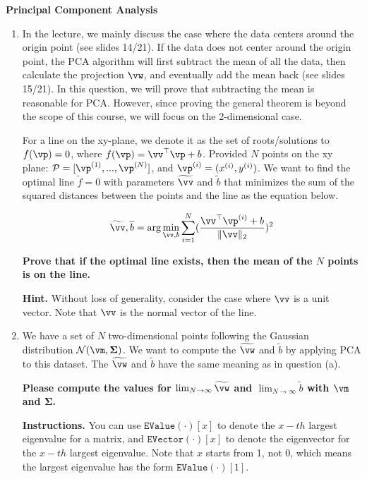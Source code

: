 \begin{Q}
\textbf{\Large Principal Component Analysis}\\

\begin{enumerate}

\item In the lecture, we mainly discuss the case where the data centers around the origin point (see slides 14/21). If the data does not center around the origin point, the PCA algorithm will first subtract the mean of all the data, then calculate the projection $\vw$, and eventually add the mean back (see slides 15/21). In this question, we will prove that subtracting the mean is reasonable for PCA. However, since proving the general theorem is beyond the scope of this course, we will focus on the 2-dimensional case.

For a line on the xy-plane, we denote it as the set of roots/solutions to $f(\vp)=0$, where $f(\vp)=\vv^\top \vp + b$. Provided $N$ points on the xy plane: $\mathcal{P}=[\vp^{(1)}, ..., \vp^{(N)}]$, and $\vp^{(i)}=(x^{(i)}, y^{(i)})$. We want to find the optimal line $\widetilde{f}=0$ with parameters $\widetilde{\vv}$ and $\widetilde{b}$ that minimizes the sum of the squared distances between the points and the line as the equation below.

\begin{equation}
    \widetilde{\vv}, \widetilde{b}=\arg\min_{\vv, b}\sum_{i=1}^{N}(\frac{\vv^\top \vp^{(i)} + b}{\|\vv\|_2})^2
\end{equation}

\textbf{Prove that if the optimal line exists, then the mean of the $N$ points is on the line.}

\textbf{Hint. } Without loss of generality, consider the case where $\vv$ is a unit vector. Note that $\vv$ is the normal vector of the line.

\iffalse
\item We have a set of $N$ two-dimensional points following the Gaussian distribution $\mathcal{N}(\vm, \mathbf{\Sigma})$. We want to compute the $\widetilde{\vw}$ and $\widetilde{b}$ by applying PCA to this dataset. The $\widetilde{\vw}$ and $\widetilde{b}$ have the same meaning as in question (a).

\textbf{Please compute the values for $\lim_{N\rightarrow \infty}\widetilde{\vw}$ and $\lim_{N\rightarrow \infty}\widetilde{b}$ with $\vm$ and $\mathbf{\Sigma}$.} 

\textbf{Instructions.} You can use $\mathtt{EValue}(\cdot)[x]$ to denote the $x-th$ largest eigenvalue for a matrix, and $\mathtt{EVector}(\cdot)[x]$ to denote the eigenvector for the $x-th$ largest eigenvalue. Note that $x$ starts from 1, not 0, which means the largest eigenvalue has the form $\mathtt{EValue}(\cdot)[1]$.


\end{enumerate}
\end{Q}

